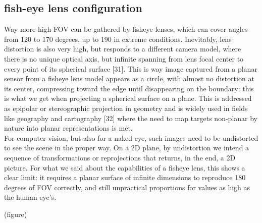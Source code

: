 \iffalse
TOED-IN
(-) edge violation, "see through a window" effect (lower immersion)
(-) keystoning effect at edges, but reducible
(+) compensate the low stereo cues area of parallel config
(+) easy to implement
(+) good vertical disparities (VSR)
\fi

\subsection{fish-eye lens configuration}
Way more high FOV can be gathered by fisheye lenses, which can cover angles from 120 to 170 degrees, up to 190 in extreme conditions. Inevitably, lens distortion is also very high, but responds to a different camera model, where there is no unique optical axis, but infinite spanning from lens focal center to every point of its spherical surface [31]. This is way image captured from a planar sensor from a fisheye lens model appears as a circle, with almost no distortion at its center, compressing toward the edge until disappearing on the boundary: this is what we get when projecting a spherical surface on a plane. This is addressed as epipolar or stereographic projection in geometry and is widely used in fields like geography and cartography [32] where the need to map targets non-planar by nature into planar representations is met.\\
For computer vision, but also for a naked eye, such images need to be undistorted to see the scene in the proper way. On a 2D plane, by undistortion we intend a sequence of transformations or reprojections that returns, in the end, a 2D picture. For what we said about the capabilities of a fisheye lens, this shows a clear limit: it requires a planar surface of infinite dimensions to reproduce 180 degrees of FOV correctly, and still unpractical proportions for values as high as the human eye’s.

(figure)

